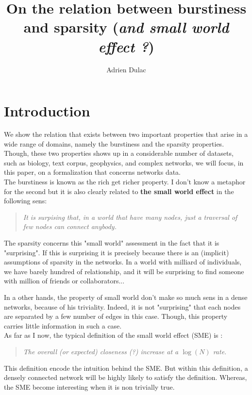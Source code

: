 \documentclass{article}
\title{On the relation between burstiness and sparsity (\emph{and small world effect ?})}
\author{Adrien Dulac}
\begin{document}
\maketitle

\section{Introduction}

We show the relation that exists between two important properties that arise in a wide range of domains, namely the burstiness and the sparsity properties. Though, these two properties shows up in a considerable number of datasets, such as biology, text corpus, geophysics, and complex networks, we will focus, in this paper, on a formalization that concerns networks data.~\\

The burstiness is known as the rich get richer property. I don't know a metaphor for the second but it is also clearly related to \textbf{the small world effect} in the following sens:

\begin{quote}
    \emph{It is surpising that, in a world that have many nodes, just a traversal of few nodes can connect anybody.}
\end{quote}

The sparsity concerns this "small world" assessment in the fact that it is "surprising". If this is surprising it is precisely because there is an (implicit) assumptions of sparsity in the networks. In a world with milliard of individuals, we have barely hundred of relationship, and it will be surprising to find someone with million of friends or collaborators...

In a other hands, the property of small world don't make so much sens in a dense networks, because of his triviality. Indeed, it is not "surprising" that each nodes are separated by a few number of edges in this case. Though, this property carries little information in such a case.  ~\\

As far as I now, the typical definition of the small world effect (SME) is :
\begin{quote}
    \emph{The overall (or expected) closeness (?) increase at a $\log(N)$ rate.}
\end{quote}

This definition encode the intuition behind the SME. But within this definition, a densely connected network will be highly likely to satisfy the definition. Whereas, the SME become interesting when it is non trivially true.~\\
\end{document}
